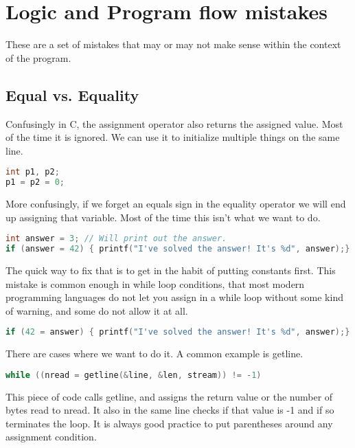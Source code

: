 \section{Logic and Program flow mistakes}

These are a set of mistakes that may or may not make sense within the context of the program.

\subsection{Equal vs. Equality}

Confusingly in C, the assignment operator also returns the assigned value.
Most of the time it is ignored.
We can use it to initialize multiple things on the same line.

\begin{lstlisting}[language=C]
int p1, p2;
p1 = p2 = 0;
\end{lstlisting}

More confusingly, if we forget an equals sign in the equality operator we will end up assigning that variable.
Most of the time this isn't what we want to do.

\begin{lstlisting}[language=C]
int answer = 3; // Will print out the answer.
if (answer = 42) { printf("I've solved the answer! It's %d", answer);}
\end{lstlisting}

The quick way to fix that is to get in the habit of putting constants first.
This mistake is common enough in while loop conditions, that most modern programming languages do not let you assign in a while loop without some kind of warning, and some do not allow it at all.

\begin{lstlisting}[language=C]
if (42 = answer) { printf("I've solved the answer! It's %d", answer);}
\end{lstlisting}

There are cases where we want to do it.
A common example is getline.

\begin{lstlisting}[language=C]
while ((nread = getline(&line, &len, stream)) != -1)
\end{lstlisting}

This piece of code calls getline, and assigns the return value or the number of bytes read to nread.
It also in the same line checks if that value is -1 and if so terminates the loop.
It is always good practice to put parentheses around any assignment condition.

